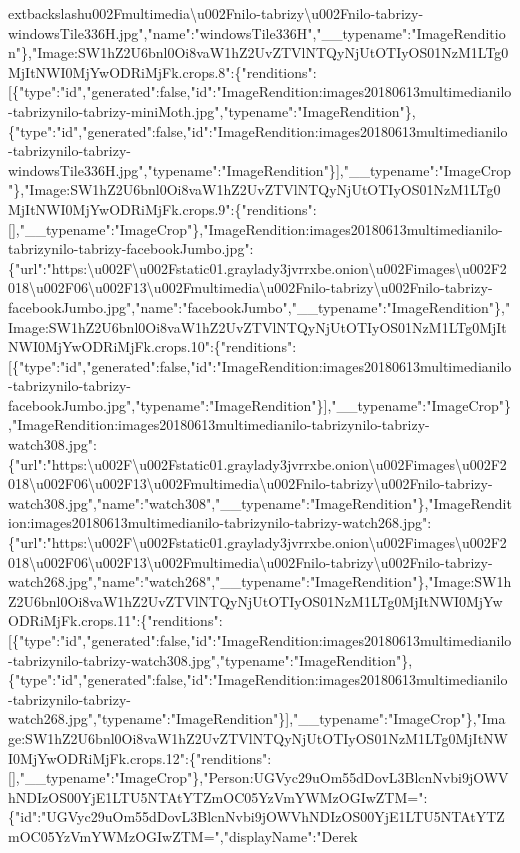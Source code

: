 extbackslash{}u002Fmultimedia\textbackslash{}u002Fnilo-tabrizy\textbackslash{}u002Fnilo-tabrizy-windowsTile336H.jpg","name":"windowsTile336H","\_\_typename":"ImageRendition"\},"Image:SW1hZ2U6bnl0Oi8vaW1hZ2UvZTVlNTQyNjUtOTIyOS01NzM1LTg0MjItNWI0MjYwODRiMjFk.crops.8":\{"renditions":{[}\{"type":"id","generated":false,"id":"ImageRendition:images20180613multimedianilo-tabrizynilo-tabrizy-miniMoth.jpg","typename":"ImageRendition"\},\{"type":"id","generated":false,"id":"ImageRendition:images20180613multimedianilo-tabrizynilo-tabrizy-windowsTile336H.jpg","typename":"ImageRendition"\}{]},"\_\_typename":"ImageCrop"\},"Image:SW1hZ2U6bnl0Oi8vaW1hZ2UvZTVlNTQyNjUtOTIyOS01NzM1LTg0MjItNWI0MjYwODRiMjFk.crops.9":\{"renditions":{[}{]},"\_\_typename":"ImageCrop"\},"ImageRendition:images20180613multimedianilo-tabrizynilo-tabrizy-facebookJumbo.jpg":\{"url":"https:\textbackslash{}u002F\textbackslash{}u002Fstatic01.graylady3jvrrxbe.onion\textbackslash{}u002Fimages\textbackslash{}u002F2018\textbackslash{}u002F06\textbackslash{}u002F13\textbackslash{}u002Fmultimedia\textbackslash{}u002Fnilo-tabrizy\textbackslash{}u002Fnilo-tabrizy-facebookJumbo.jpg","name":"facebookJumbo","\_\_typename":"ImageRendition"\},"Image:SW1hZ2U6bnl0Oi8vaW1hZ2UvZTVlNTQyNjUtOTIyOS01NzM1LTg0MjItNWI0MjYwODRiMjFk.crops.10":\{"renditions":{[}\{"type":"id","generated":false,"id":"ImageRendition:images20180613multimedianilo-tabrizynilo-tabrizy-facebookJumbo.jpg","typename":"ImageRendition"\}{]},"\_\_typename":"ImageCrop"\},"ImageRendition:images20180613multimedianilo-tabrizynilo-tabrizy-watch308.jpg":\{"url":"https:\textbackslash{}u002F\textbackslash{}u002Fstatic01.graylady3jvrrxbe.onion\textbackslash{}u002Fimages\textbackslash{}u002F2018\textbackslash{}u002F06\textbackslash{}u002F13\textbackslash{}u002Fmultimedia\textbackslash{}u002Fnilo-tabrizy\textbackslash{}u002Fnilo-tabrizy-watch308.jpg","name":"watch308","\_\_typename":"ImageRendition"\},"ImageRendition:images20180613multimedianilo-tabrizynilo-tabrizy-watch268.jpg":\{"url":"https:\textbackslash{}u002F\textbackslash{}u002Fstatic01.graylady3jvrrxbe.onion\textbackslash{}u002Fimages\textbackslash{}u002F2018\textbackslash{}u002F06\textbackslash{}u002F13\textbackslash{}u002Fmultimedia\textbackslash{}u002Fnilo-tabrizy\textbackslash{}u002Fnilo-tabrizy-watch268.jpg","name":"watch268","\_\_typename":"ImageRendition"\},"Image:SW1hZ2U6bnl0Oi8vaW1hZ2UvZTVlNTQyNjUtOTIyOS01NzM1LTg0MjItNWI0MjYwODRiMjFk.crops.11":\{"renditions":{[}\{"type":"id","generated":false,"id":"ImageRendition:images20180613multimedianilo-tabrizynilo-tabrizy-watch308.jpg","typename":"ImageRendition"\},\{"type":"id","generated":false,"id":"ImageRendition:images20180613multimedianilo-tabrizynilo-tabrizy-watch268.jpg","typename":"ImageRendition"\}{]},"\_\_typename":"ImageCrop"\},"Image:SW1hZ2U6bnl0Oi8vaW1hZ2UvZTVlNTQyNjUtOTIyOS01NzM1LTg0MjItNWI0MjYwODRiMjFk.crops.12":\{"renditions":{[}{]},"\_\_typename":"ImageCrop"\},"Person:UGVyc29uOm55dDovL3BlcnNvbi9jOWVhNDIzOS00YjE1LTU5NTAtYTZmOC05YzVmYWMzOGIwZTM=":\{"id":"UGVyc29uOm55dDovL3BlcnNvbi9jOWVhNDIzOS00YjE1LTU5NTAtYTZmOC05YzVmYWMzOGIwZTM=","displayName":"Derek
